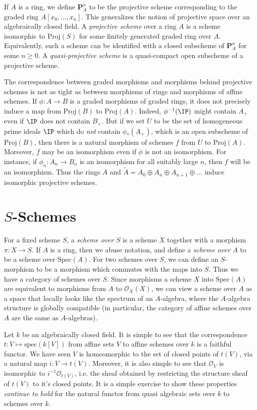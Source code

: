 If $A$ is a ring, we define $\mathbf{P}^n_A$ to be the projective scheme corresponding to the graded ring $A[x_0,\dots,x_n]$. This generalizes the notion of projective space over an algebraically closed field. A \emph{projective scheme} over a ring $A$ is a scheme isomorphic to $\text{Proj}(S)$ for some finitely generated graded ring over $A$. Equivalently, such a scheme can be identified with a closed subscheme of $\mathbf{P}^n_A$ for some $n \geq 0$. A \emph{quasi-projective scheme} is a quasi-compact open subscheme of a projective scheme.

The correspondence between graded morphisms and morphisms behind projective schemes is not as tight as between morphisms of rings and morphisms of affine schemes. If $\phi: A \to B$ is a graded morphisms of graded rings, it does not precisely induce a map from $\text{Proj}(B)$ to $\text{Proj}(A)$. Indeed, $\phi^{-1}(\IP)$ might contain $A_+$ even if $\IP$ does not contain $B_+$. But if we set $U$ to be the set of homogeneous prime ideals $\IP$ which do \emph{not} contain $\phi_*(A_+)$, which is an open subscheme of $\text{Proj}(B)$, then there is a natural morphism of schemes $f$ from $U$ to $\text{Proj}(A)$. Moreover, $f$ may be an isomorphism even if $\phi$ is not an isomorphism. For instance, if $\phi_n: A_n \to B_n$ is an isomorphism for all suitably large $n$, then $f$ will be an isomorphism. Thus the rings $A$ and $\tilde{A} = A_0 \oplus A_n \oplus A_{n+1} \oplus \dots$ induce isomorphic projective schemes.

\section{$S$-Schemes}

For a fixed scheme $S$, a \emph{scheme over $S$} is a scheme $X$ together with a morphism $\pi: X \to S$. If $A$ is a ring, then we abuse notation, and define a \emph{scheme over $A$} to be a scheme over $\text{Spec}(A)$. For two schemes over $S$, we can define an $S$-morphism to be a morphism which commutes with the maps into $S$. Thus we have a category of schemes over $S$. Since morphisms a scheme $X$ into $\text{Spec}(A)$ are equivalent to morphisms from $A$ to $\mathcal{O}_X(X)$, we can view a scheme over $A$ as a space that locally looks like the spectrum of an $A$-algebra, where the $A$-algebra structure is globally compatible (in particular, the category of affine schemes over $A$ are the same as $A$-algebras).

\begin{example}
    Let $k$ be an algebraically closed field. It is simple to see that the correspondence $t: V \mapsto \text{spec}(k[V])$ from affine sets $V$ to affine schemes over $k$ is a faithful functor. We have seen $V$ is homeomorphic to the set of closed points of $t(V)$, via a natural map $i: V \to t(V)$. Moreover, it is also simple to see that $\mathcal{O}_V$ is isomorphic to $i^{-1} \mathcal{O}_{t(V)}$, i.e. the sheaf obtained by restricting the structure sheaf of $t(V)$ to it's closed points. It is a simple exercise to show these properties \emph{continue to hold} for the natural functor from quasi algebraic sets over $k$ to schemes over $k$.
\end{example} 


